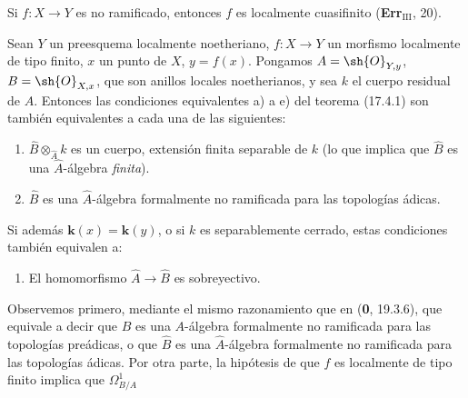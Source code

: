\begin{corollary}[17.4.3]
\label{IV.17.4.3}
Si $f:X\to Y$ es no ramificado, entonces $f$ es localmente cuasifinito \textup{(\textbf{Err}$_{\mathrm{III}}$, 20)}.
\end{corollary}

\begin{proposition}[17.4.4]
\label{IV.17.4.4}
Sean $Y$ un preesquema \textup{localmente noetheriano}, $f:X\to Y$ un morfismo localmente de tipo finito, $x$ un punto de $X$, $y=f(x)$. Pongamos $A=\sh{O}_{Y,y}$, $B=\sh{O}_{X,x}$, que son anillos locales noetherianos, y sea $k$ el cuerpo residual de $A$. Entonces las condiciones equivalentes \textup{a)} a \textup{e)} del teorema \textup{(17.4.1)} son también equivalentes a cada una de las siguientes:
\begin{enumerate}
  \item[\textup{f)}] $\widehat{B}\otimes_{\widehat{A}}k$ es un cuerpo, extensión finita separable de $k$ \textup{(lo que implica que $\widehat{B}$ es una $\widehat{A}$-álgebra \emph{finita})}.
  \item[\textup{f$'$)}] $\widehat{B}$ es una $\widehat{A}$-álgebra formalmente no ramificada para las topologías ádicas.
\end{enumerate}
Si además $\boldsymbol{k}(x)=\boldsymbol{k}(y)$, o si $k$ es separablemente cerrado, estas condiciones también equivalen a:
\begin{enumerate}
  \item[\textup{f$''$)}] El homomorfismo $\widehat{A}\to\widehat{B}$ es sobreyectivo.
\end{enumerate}
\end{proposition}

Observemos primero, mediante el mismo razonamiento que en (\textbf 0, 19.3.6), que equivale a decir que $B$ es una $A$-álgebra formalmente no ramificada para las topologías preádicas, o que $\widehat{B}$ es una $\widehat{A}$-álgebra formalmente no ramificada para las topologías ádicas. Por otra parte, la hipótesis de que $f$ es localmente de tipo finito implica que $\Omega^1_{B/A}$

